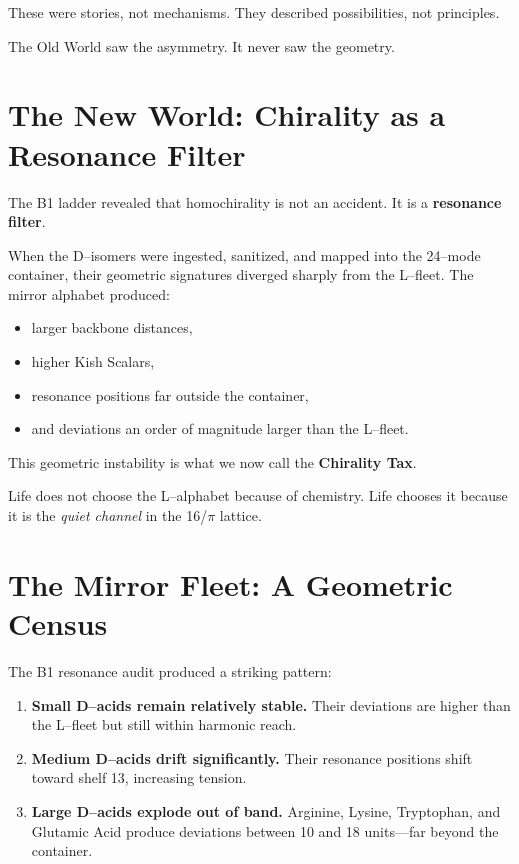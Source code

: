 \documentclass[11pt, letterpaper, openany]{book}
\begin{document}
These were stories, not mechanisms.  
They described possibilities, not principles.

The Old World saw the asymmetry.  
It never saw the geometry.

\section*{The New World: Chirality as a Resonance Filter}

The B1 ladder revealed that homochirality is not an accident.  
It is a \textbf{resonance filter}.

When the D–isomers were ingested, sanitized, and mapped into the 24–mode
container, their geometric signatures diverged sharply from the L–fleet. The
mirror alphabet produced:

\begin{itemize}
    \item larger backbone distances,
    \item higher Kish Scalars,
    \item resonance positions far outside the container,
    \item and deviations an order of magnitude larger than the L–fleet.
\end{itemize}

This geometric instability is what we now call the \textbf{Chirality Tax}.

Life does not choose the L–alphabet because of chemistry.  
Life chooses it because it is the \textit{quiet channel} in the 16/$\pi$ lattice.

\section{The Mirror Fleet: A Geometric Census}

The B1 resonance audit produced a striking pattern:

\begin{enumerate}
    \item \textbf{Small D–acids remain relatively stable.}  
    Their deviations are higher than the L–fleet but still within harmonic reach.

    \item \textbf{Medium D–acids drift significantly.}  
    Their resonance positions shift toward shelf 13, increasing tension.

    \item \textbf{Large D–acids explode out of band.}  
    Arginine, Lysine, Tryptophan, and Glutamic Acid produce deviations between
    10 and 18 units—far beyond the container.
\end{enumerate}
\end{document}
